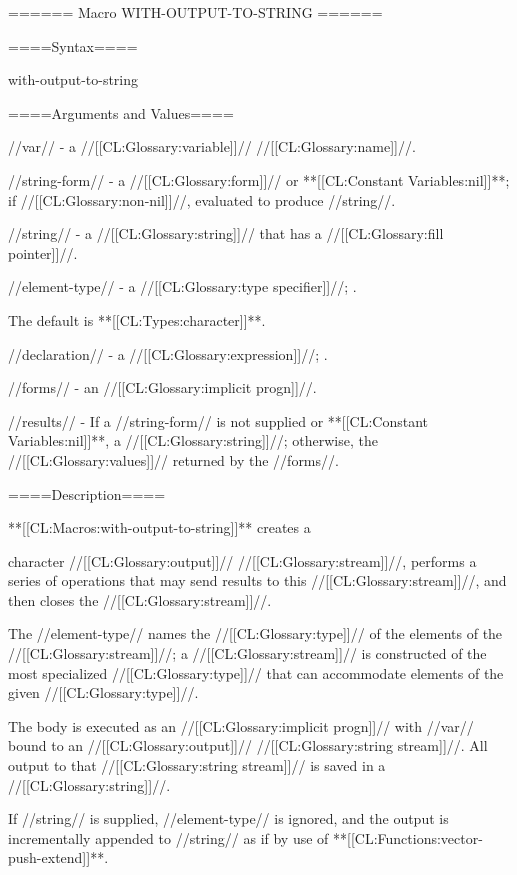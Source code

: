 ====== Macro WITH-OUTPUT-TO-STRING ======

====Syntax====

\DefmacWithValuesNewline with-output-to-string {  } {}

====Arguments and Values====

//var// - a //[[CL:Glossary:variable]]// //[[CL:Glossary:name]]//.

//string-form// - a //[[CL:Glossary:form]]// or **[[CL:Constant Variables:nil]]**; if //[[CL:Glossary:non-nil]]//, evaluated to produce //string//.

//string// - a //[[CL:Glossary:string]]// that has a //[[CL:Glossary:fill pointer]]//.

//element-type// - a //[[CL:Glossary:type specifier]]//; \eval.

The default is **[[CL:Types:character]]**.

//declaration// - a  //[[CL:Glossary:expression]]//; \noeval.

//forms// - an //[[CL:Glossary:implicit progn]]//.

//results// - If a //string-form// is not supplied or **[[CL:Constant Variables:nil]]**, a //[[CL:Glossary:string]]//; otherwise, the //[[CL:Glossary:values]]// returned by the //forms//.

====Description====

**[[CL:Macros:with-output-to-string]]** creates a

character //[[CL:Glossary:output]]// //[[CL:Glossary:stream]]//, performs a series of operations that may send results to this //[[CL:Glossary:stream]]//, and then closes the //[[CL:Glossary:stream]]//.

The //element-type// names the //[[CL:Glossary:type]]// of the elements of the //[[CL:Glossary:stream]]//; a //[[CL:Glossary:stream]]// is constructed of the most specialized //[[CL:Glossary:type]]// that can accommodate elements of the given //[[CL:Glossary:type]]//.

The body is executed as an //[[CL:Glossary:implicit progn]]// with //var// bound to an //[[CL:Glossary:output]]// //[[CL:Glossary:string stream]]//. All output to that //[[CL:Glossary:string stream]]// is saved in a //[[CL:Glossary:string]]//.

If //string// is supplied, //element-type// is ignored, and the output is incrementally appended to //string// as if by use of **[[CL:Functions:vector-push-extend]]**.

